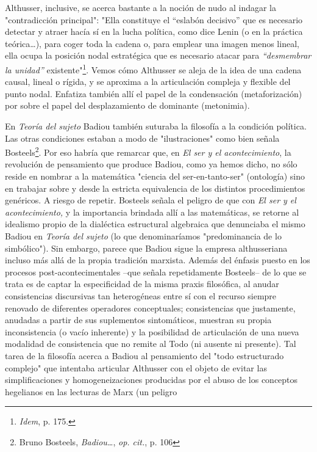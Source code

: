 \documentclass{book}
\begin{document}
Althusser, inclusive, se acerca bastante a la noción de nudo al indagar
la "contradicción principal": "Ella constituye el ``eslabón decisivo''
que es necesario detectar y atraer hacía sí en la lucha política, como
dice Lenin (o en la práctica teórica\ldots), para coger toda la cadena
o, para emplear una imagen menos lineal, ella ocupa la posición nodal
estratégica que es necesario atacar para \emph{``desmembrar la unidad''}
existente"\footnote{\emph{Idem}, p. 175.}. Vemos cómo Althusser se aleja
de la idea de una cadena causal, lineal o rígida, y se aproxima a la
articulación compleja y flexible del punto nodal. Enfatiza también allí
el papel de la condensación (metaforización) por sobre el papel del
desplazamiento de dominante (metonimia).

En \emph{Teoría del sujeto} Badiou también suturaba la filosofía a la
condición política. Las otras condiciones estaban a modo de
"ilustraciones" como bien señala Bosteels\footnote{Bruno Bosteels,
  \emph{Badiou\ldots{}}, \emph{op. cit.}, p. 106}. Por eso habría que
remarcar que, en \emph{El ser y el acontecimiento}, la revolución de
pensamiento que produce Badiou, como ya hemos dicho, no sólo reside en
nombrar a la matemática "ciencia del ser-en-tanto-ser" (ontología) sino
en trabajar sobre y desde la estricta equivalencia de los distintos
procedimientos genéricos. A riesgo de repetir. Bosteels señala el
peligro de que con \emph{El ser y el acontecimiento,} y la importancia
brindada allí a las matemáticas, se retorne al idealismo propio de la
dialéctica estructural algebraica que denunciaba el mismo Badiou en
\emph{Teoría del sujeto} (lo que denominaríamos "predominancia de lo
simbólico"). Sin embargo, parece que Badiou sigue la empresa
althusseriana incluso más allá de la propia tradición marxista. Además
del énfasis puesto en los procesos post-acontecimentales --que señala
repetidamente Bosteels-- de lo que se trata es de captar la
especificidad de la misma praxis filosófica, al anudar consistencias
discursivas tan heterogéneas entre sí con el recurso siempre renovado de
diferentes operadores conceptuales; consistencias que justamente,
anudadas a partir de sus suplementos sintomáticos, muestran su propia
inconsistencia (o vacío inherente) y la posibilidad de articulación de
una nueva modalidad de consistencia que no remite al Todo (ni ausente ni
presente). Tal tarea de la filosofía acerca a Badiou al pensamiento del
"todo estructurado complejo" que intentaba articular Althusser con el
objeto de evitar las simplificaciones y homogeneizaciones producidas por
el abuso de los conceptos hegelianos en las lecturas de Marx (un peligro
\end{document}
